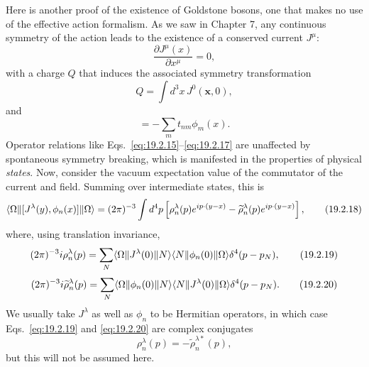 Here is another proof of the existence of Goldstone bosons, one that makes no
use of the effective action formalism. As we saw in Chapter 7, any continuous
symmetry of the action leads to the existence of a conserved current $J^\mu$:
\begin{equation}
 \frac{\partial J^\mu(x)}{\partial x^\mu}=0,
 \tag{19.2.15}\label{eq:19.2.15}
\end{equation}
with a charge $Q$ that induces the associated symmetry transformation
\begin{equation}
 Q=\int d^3x\,J^0(\mathbf x,0),
 \tag{19.2.16}\label{eq:19.2.16}
\end{equation}
and
\begin{equation}
 [Q,\phi_n(x)]=-\sum_m t_{nm}\phi_m(x).
 \tag{19.2.17}\label{eq:19.2.17}
\end{equation}
Operator relations like Eqs.~\eqref{eq:19.2.15}--\eqref{eq:19.2.17} are
unaffected by spontaneous symmetry breaking, which is manifested in the
properties of physical \emph{states}. Now, consider the vacuum expectation
value of the commutator of the current and field. Summing over intermediate
states, this is
\begin{equation}
 \langle \Omega\rVert[J^\lambda(y),\phi_n(x)]\lVert \Omega\rangle
 =(2\pi)^{-3}\int d^4p
 \left[\rho_n^\lambda(p)e^{ip\cdot(y-x)}
 -\widetilde\rho_n^\lambda(p)e^{ip\cdot(y-x)}\right],
 \tag{19.2.18}\label{eq:19.2.18}
\end{equation}
where, using translation invariance,
\begin{equation}
 (2\pi)^{-3}i\rho_n^\lambda(p)
 =\sum_N
 \langle \Omega\rVert J^\lambda(0)\lVert N\rangle
 \langle N\rVert\phi_n(0)\lVert \Omega\rangle
 \delta^4(p-p_N),
 \tag{19.2.19}\label{eq:19.2.19}
\end{equation}
\begin{equation}
 (2\pi)^{-3}i\widetilde\rho_n^\lambda(p)
 =\sum_N
 \langle \Omega\rVert\phi_n(0)\lVert N\rangle
 \langle N\rVert J^\lambda(0)\lVert \Omega\rangle
 \delta^4(p-p_N).
 \tag{19.2.20}\label{eq:19.2.20}
\end{equation}
We usually take $J^\lambda$ as well as $\phi_n$ to be Hermitian operators, in
which case Eqs.~\eqref{eq:19.2.19} and \eqref{eq:19.2.20} are complex
conjugates
\begin{equation}
 \rho_n^\lambda(p)=-\widetilde\rho_n^{\lambda *}(p),
 \tag{19.2.21}\label{eq:19.2.21}
\end{equation}
but this will not be assumed here.

